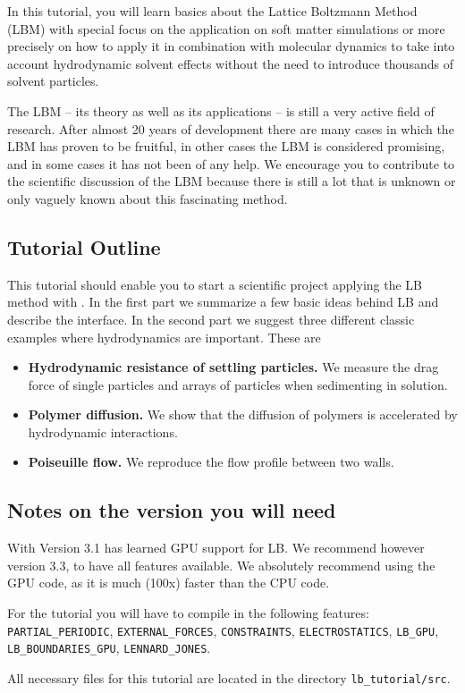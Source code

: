 In this tutorial, you will learn basics about the 
Lattice Boltzmann Method (LBM) with special focus on the application
on soft matter simulations or more precisely on how to apply it 
in combination with molecular dynamics to take into account 
hydrodynamic solvent effects without the need to introduce
thousands of solvent particles. 

The LBM -- its theory as well as its applications -- is 
still a very active field of research. After almost 20 years
of development there are many cases in which the LBM has proven
to be fruitful, in other cases the LBM is considered promising,
and in some cases it has not been of any help. We
encourage you to contribute to the scientific discussion 
of the LBM because there is still a lot 
that is unknown or only vaguely known about this fascinating
method. 

\subsection*{Tutorial Outline}
This tutorial should enable you to start a scientific project applying
the LB method with \ES{}. In the first part we summarize a few basic ideas behind LB 
and describe the interface. In the second part we suggest three
different classic examples where hydrodynamics are important. These are
\begin{itemize}
  \item {\bf Hydrodynamic resistance of settling particles.} We measure the drag
   force of single particles and arrays of particles when sedimenting
   in solution.
  \item {\bf Polymer diffusion.} We show that the diffusion of polymers is accelerated 
    by hydrodynamic interactions.
  \item {\bf Poiseuille flow.} We reproduce the flow profile between two walls.
\end{itemize}

\subsection*{Notes on the \ES{} version you will need}
With Version 3.1 \ES{} has learned GPU support for LB. We recommend however
version 3.3, to have all features available. We absolutely recommend using 
the GPU code, as it is much (100x) faster than the CPU code.

For the tutorial you will have to compile in the following  features:
{\tt PARTIAL\_PERIODIC}, {\tt EXTERNAL\_FORCES}, {\tt CONSTRAINTS}, {\tt ELECTROSTATICS}, 
{\tt LB\_GPU}, {\tt LB\_BOUNDARIES\_GPU},  {\tt LENNARD\_JONES}.

All necessary files for this tutorial are located in the directory {\tt lb\_tutorial/src}.
\pagebreak


